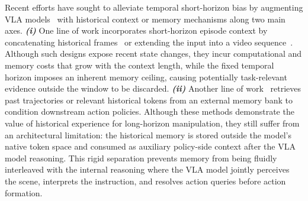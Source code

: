 Recent efforts have sought to alleviate temporal short-horizon bias by augmenting VLA models~\cite{chi2025diffusion,li2024language,ze20243d} with historical context or memory mechanisms along two main axes.
\textit{\textbf{(i)}} One line of work incorporates short-horizon episode context by concatenating historical frames~\citep{li2024towards,fan2025interleave} or extending the input into a video sequence~\citep{li2025cronusvla,koo2025hamlet,hu2026resolving}.
Although such designs expose recent state changes, they incur computational and memory costs that grow with the context length, while the fixed temporal horizon imposes an inherent memory ceiling, causing potentially task-relevant evidence outside the window to be discarded.
\textit{\textbf{(ii)}} Another line of work~\citep{shi2025memoryvla,sridhar2025memer,li2026global} retrieves past trajectories or relevant historical tokens from an external memory bank to condition downstream action policies.
Although these methods demonstrate the value of historical experience for long-horizon manipulation, they still suffer from an architectural limitation: the historical memory is stored outside the model's native token space and consumed as auxiliary policy-side context after the VLA model reasoning.
This rigid separation prevents memory from being fluidly interleaved with the internal reasoning where the VLA model jointly perceives the scene, interprets the instruction, and resolves action queries before action formation.

